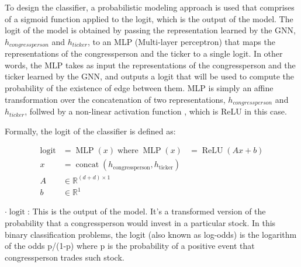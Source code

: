 \documentclass[15pt,letterpaper]{article}
\begin{document}
To design the classifier, a probabilistic modeling approach is used that comprises of a sigmoid function applied to the logit, which is the output of the model. The logit of the model is obtained by passing the representation learned by the GNN, $h_{congressperson}$ and $h_{ticker}$, to an MLP (Multi-layer perceptron) \citep{Gardner1998ArtificialNN, 7103337} that maps the representations of the congressperson and the ticker to a single logit. In other words, the MLP takes as input the representations of the congressperson and the ticker learned by the GNN, and outputs a logit that will be used to compute the probability of the existence of edge between them. MLP is simply an affine transformation over the concatenation of two representations, $h_{congressperson}$ and $h_{ticker}$, follwed by a non-linear activation function \citep{nonl}, which is ReLU \citep{relu} in this case.

Formally, the logit of the classifier is defined as:


\begin{align*}
  \operatorname{logit} &= \operatorname{MLP}\left(x\right) \operatorname{ where } \operatorname{MLP}(x) &= \operatorname{ReLU}(Ax + b) \\
  x &= \operatorname{concat}\left(h_{\text{congressperson}}, h_{\text{ticker}}\right) \\
  A &\in \mathbb{R}^{(d+d) \times 1} \\
  b &\in \mathbb{R}^{1}
\end{align*}
  
  $\boldsymbol{\cdot}\operatorname{logit}$: This is the output of the model. It's a transformed version of the probability that a congressperson would invest in a particular stock. In this binary classification problems, the logit (also known as log-odds) is the logarithm of the odds p/(1-p) where p is the probability of a positive event that congressperson trades such stock.
  
\end{document}

